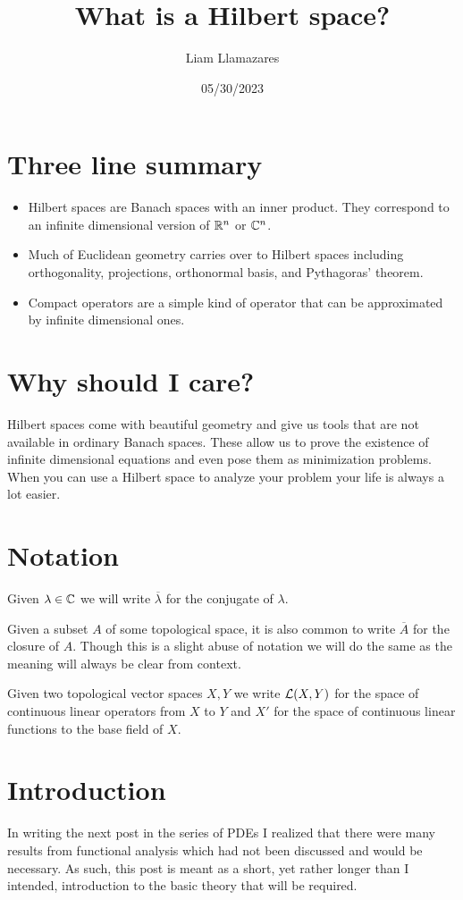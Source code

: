 \documentclass[12pt]{article}
\begin{document}
\begin{CJK*}{UTF8}{gbsn}
	\title{What is a Hilbert space?}
	\author{Liam Llamazares}
	\date{05/30/2023}
	\maketitle
	\section{ Three line summary}
	\begin{itemize}
		\item Hilbert spaces are Banach spaces with an inner product. They correspond to an infinite dimensional version of $\mathbb{R}^n$ or $\mathbb{C}^n$.
		\item Much of Euclidean geometry carries over to Hilbert spaces including orthogonality, projections, orthonormal basis, and Pythagoras' theorem.
		\item Compact operators are a simple kind of operator that can be approximated by infinite dimensional ones.
	\end{itemize}
	\section{Why should I care?}
	Hilbert spaces come with beautiful geometry and give us tools that are not available in ordinary Banach spaces. These allow us to prove the existence of infinite dimensional equations and even pose them as minimization problems. When you can use a Hilbert space to analyze your problem your life is always a lot easier.
	\section{Notation}
	Given $\lambda \in \mathbb{C}$ we will write $\overline{\lambda }$ for the conjugate of $\lambda $.

	Given a subset $A$ of some topological space, it is also common to write  $\overline{A}$ for the closure of $A$. Though this is a slight abuse of notation we will do the same as the meaning will always be clear from context.

	Given two topological vector spaces $X, Y$ we write  $\mathcal{L}(X, Y)$ for the space of continuous linear operators from $X$ to  $Y$ and $X'$ for the space of continuous linear functions to the base field of $X$.


	\section{Introduction}
	In writing the next post in the series of PDEs I realized that there were many results from functional analysis which had not been discussed and would be necessary. As such, this post is meant as a short, yet rather longer than I intended, introduction to the basic theory that will be required.


\end{CJK*}
\end{document}
